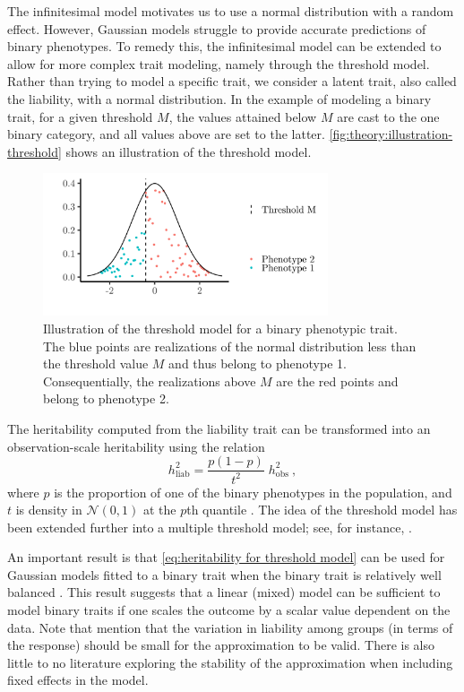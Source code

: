 The infinitesimal model motivates us to use a normal distribution with a random effect. However, Gaussian models struggle to provide accurate predictions of binary phenotypes. To remedy this, the infinitesimal model can be extended to allow for more complex trait modeling, namely through the threshold model. Rather than trying to model a specific trait, we consider a latent trait, also called the liability, with a normal distribution. In the example of modeling a binary trait, for a given threshold $M$, the values attained below $M$ are cast to the one binary category, and all values above are set to the latter. \autoref{fig:theory:illustration-threshold} shows an illustration of the threshold model.
\begin{figure}
    \centering
    \includegraphics[width=0.75\textwidth]{figures/illustration_thresholdmodel.pdf}
    \caption[Illustration of the threshold model]{Illustration of the threshold model for a binary phenotypic trait. The blue points are realizations of the normal distribution less than the threshold value $M$ and thus belong to phenotype 1. Consequentially, the realizations above $M$ are the red points and belong to phenotype 2.}
    \label{fig:theory:illustration-threshold}
\end{figure}
The heritability computed from the liability trait can be transformed into an observation-scale heritability using the relation
\begin{equation}
h^2_{\text{liab}} = \frac{p(1-p)}{t^2}\;h^2_{\text{obs}} \ ,
\label{eq:heritability for threshold model}
\end{equation}
where $p$ is the proportion of one of the binary phenotypes in the population, and $t$ is density in $\mathcal N(0,1)$ at the $p$th quantile \autocite{dempster1950heritability, de2018quantitative}. The idea of the threshold model has been extended further into a multiple threshold model; see, for instance, \textcite{reich1972use}.

An important result is that \eqref{eq:heritability for threshold model} can be used for Gaussian models fitted to a binary trait when the binary trait is relatively well balanced \autocite{vanvleck1972, elston1977}. This result suggests that a linear (mixed) model can be sufficient to model binary traits if one scales the outcome by a scalar value dependent on the data. Note that \textcite{elston1977} mention that the variation in liability among groups (in terms of the response) should be small for the approximation to be valid. There is also little to no literature exploring the stability of the approximation when including fixed effects in the model.

